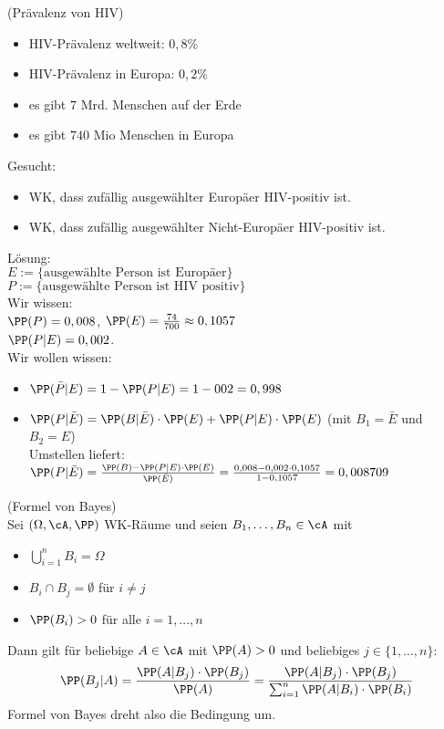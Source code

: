 \documentclass{scrreprt}
\begin{document}
 (Prävalenz von HIV)
\begin{itemize}
\item HIV-Prävalenz weltweit: $0,8\%$
\item HIV-Prävalenz in Europa: $0,2\%$
\item es gibt $7$ Mrd. Menschen auf der Erde
\item es gibt $740$ Mio Menschen in Europa
\end{itemize}
Gesucht:
\begin{itemize}
\item WK, dass zufällig ausgewählter Europäer HIV-positiv ist.
\item WK, dass zufällig ausgewählter Nicht-Europäer HIV-positiv ist.
\end{itemize}
Lösung:\\
$E:=\{\text{ausgewählte Person ist Europäer}\}$\\
$P:=\{\text{ausgewählte Person ist HIV positiv}\}$\\
Wir wissen: \\
$\PP(P)=0,008$, $\PP(E)=\frac{74}{700}\approx 0,1057$\\
$\PP(P|E)=0,002$.\\
Wir wollen wissen:
\begin{itemize}
\item $\PP(\bar P | E)=1-\PP(P|E)=1-002=0,998$
\item $\PP(P | \bar E)=\PP(B|\bar E) \cdot \PP(E)+\PP(P|E) \cdot \PP(E)$ (mit $B_1=\bar E$ und $B_2=E$)\\
Umstellen liefert:\\
$\PP(P|\bar E) = \frac{\PP(B)-\PP(P|E)\cdot\PP(E)}{\PP(\bar E)}=\frac{0,008-0,002\cdot 0,1057}{1-0,1057}=0,008709$
\end{itemize}

 (Formel von Bayes)\\
Sei $(\Omega, \cA, \PP)$ WK-Räume und seien $B_1,\dots,B_n \in \cA$ mit 
\begin{itemize}
\item $\bigcup_{i=1}^n B_i = \Omega$
\item $B_i \cap B_j = \emptyset $ für $i \not= j$
\item $\PP (B_i) >0$ für alle $i=1,\dots,n$
\end{itemize}
Dann gilt für beliebige $A \in \cA$ mit $\PP(A) >0$ und beliebiges $j\in \{1,\dots,n\}$:
$$\PP(B_j|A)=\frac{\PP(A|B_j)\cdot \PP(B_j)}{\PP(A)}=\frac{\PP(A|B_j)\cdot \PP(B_j)}{\sum_{i=1}^n \PP(A|B_i) \cdot \PP(B_i)}$$
Formel von Bayes dreht also die Bedingung um.
\end{document}
